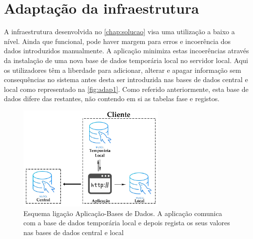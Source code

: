 \documentclass[11pt,twoside,a4paper]{report}
\begin{document}
\section{Adaptação da infraestrutura}
\label{subchap:adap}
A infraestrutura desenvolvida no \autoref{chap:solucao} visa uma utilização a baixo a nível. Ainda que funcional, pode haver margem para erros e incoerência dos dados introduzidos manualmente. A aplicação minimiza estas incoerências através da instalação de uma nova base de dados temporária local no servidor local. Aqui os utilizadores têm a liberdade para adicionar, alterar e apagar informação sem consequências no sistema antes desta ser introduzida nas bases de dados central e local como representado na \autoref{fig:adap1}. Como referido anteriormente, esta base de dados difere das restantes, não contendo em si as tabelas fase e registos.
\begin{figure}[H]
	\begin{center}
		\includegraphics[width=0.65\textwidth]{Aplicacao_temp_local_central} %
		\caption{Esquema ligação Aplicação-Bases de Dados. A aplicação comunica com a base de dados temporária local e depois regista os seus valores nas bases de dados central e local}
		\label{fig:adap1}
	\end{center}
\end{figure}
\end{document}
